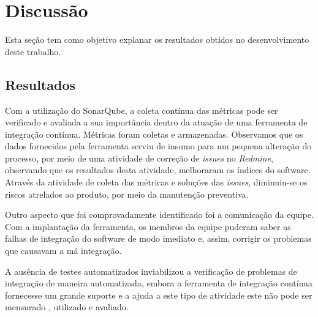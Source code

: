 \chapter{Discussão}
Esta seção tem como objetivo explanar os resultados obtidos no desenvolvimento deste trabalho.
\section{Resultados}

Com a utilização do SonarQube, a coleta contínua das métricas pode ser verificado e avaliada a sua importância dentro da atuação de uma ferramenta de integração contínua. Métricas foram coletas e armazenadas. Observamos que os dados fornecidos pela ferramenta serviu de insumo para um pequena alteração do processo, por meio de uma atividade de correção de \textit{issues} no \textit{Redmine}, observando que os resultados desta atividade, melhoraram os índices do software. Através da atividade de coleta das métricas e soluções das \textit{issues}, diminuiu-se os riscos atrelados ao produto, por meio da manutenção preventiva.

Outro aspecto que foi comprovadamente identificado foi a comunicação da equipe. Com a implantação da ferramenta, os membros da equipe puderam saber as falhas de integração do software de modo imediato e, assim, corrigir os problemas que causavam a má integração.

A ausência de testes automatizados inviabilizou a verificação de problemas de integração de maneira automatizada, embora a ferramenta de integração contínua fornecesse um grande suporte e a ajuda a este tipo de atividade este não pode ser mensurado , utilizado e avaliado.



